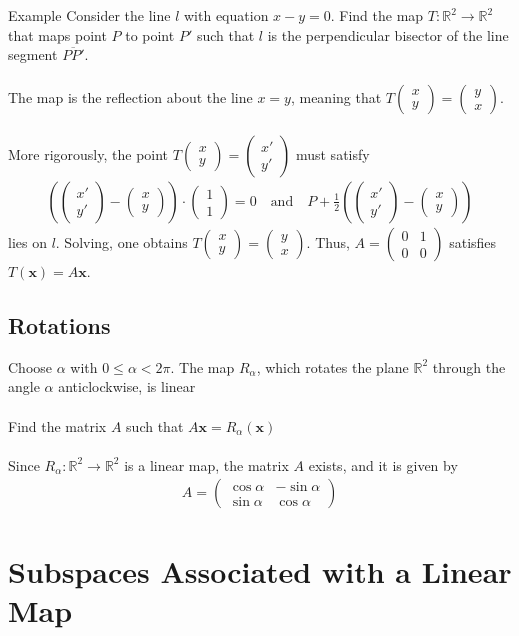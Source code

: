\documentclass{report}
\renewcommand{\vec}{\mathbf}
\newcommand{\cvec}[1]{ \begin{pmatrix} #1 \end{pmatrix} }
\begin{document}
\begin{enumerate}
		\begin{question}{Example}
			Consider the line $l$ with equation $x - y = 0$. Find the map $T: \mathbb{R}^2 \to \mathbb{R}^2$ that maps point $P$ to point $P'$ such that $l$ is the perpendicular bisector of the line segment $\overline{PP'}$.
			\\ \\
			The map is the reflection about the line $x = y$, meaning that $T\cvec{x\\y} = \cvec{y\\x}$.
			\\ \\
			More rigorously, the point $T\cvec{x\\y} = \cvec{x'\\y'}$ must satisfy
			\begin{align*}
				\left(\cvec{x'\\y'} - \cvec{x\\y}\right) \cdot \cvec{1\\1} = 0 \quad \text{and} \quad P + \frac{1}{2} \left(\cvec{x'\\y'} - \cvec{x\\y}\right)
			\end{align*}
			lies on $l$. Solving, one obtains $T\cvec{x\\y} = \cvec{y\\x}$. Thus, $A = \cvec{0&1\\0&0}$ satisfies $T(\vec{x}) = A\vec{x}$.
		\end{question}

		\subsection{Rotations}

			Choose $\alpha$ with $0 \leq \alpha < 2 \pi$. The map $R_\alpha$, which rotates the plane $\mathbb{R}^2$ through the angle $\alpha$ anticlockwise, is linear
			\\ \\
			Find the matrix $A$ such that $A\vec{x} = R_\alpha(\vec{x})$
			\\ \\
			Since $R_\alpha: \mathbb{R}^2 \to \mathbb{R}^2$ is a linear map, the matrix $A$ exists, and it is given by
			\begin{align*}
				A = \cvec{\cos\alpha & -\sin\alpha\\\sin\alpha&\cos\alpha}
			\end{align*}

	\section{Subspaces Associated with a Linear Map}


\end{enumerate}
\end{document}
